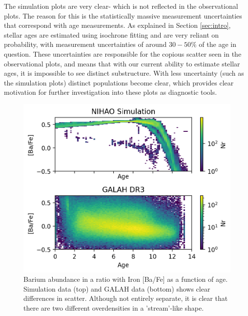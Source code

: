 \documentclass[fleqn,usenatbib]{mnras}
\begin{document}
The simulation plots are very clear- which is not reflected in the observational plots. The reason for this is the statistically massive measurement uncertainties that correspond with age measurements. As explained in Section \ref{sec:intro}, stellar ages are estimated using isochrone fitting and are very reliant on probability, with measurement uncertainties of around $30-50\%$ of the age in question. These uncertainties are responsible for the copious scatter seen in the observational plots, and means that with our current ability to estimate stellar ages, it is impossible to see distinct substructure. With less uncertainty (such as the simulation plots) distinct populations become clear, which provides clear motivation for further investigation into these plots as diagnostic tools. 
\begin{figure}
	\includegraphics[width=\columnwidth]{Ba_Fe_time.png}
    \caption{Barium abundance in a ratio with Iron [Ba/Fe] as a function of age. Simulation data (top) and GALAH data (bottom) shows clear differences in scatter. Although not entirely separate, it is clear that there are two different overdensities in a 'stream'-like shape.}
    \label{fig:BaFetime}
\end{figure}
\end{document}
